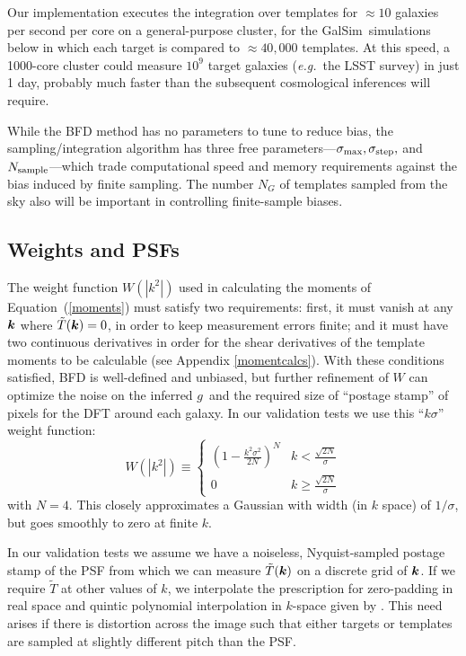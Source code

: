 \documentclass[11pt,preprint,flushrt]{aastex}
\def\eqq#1{Equation~(\ref{#1})}
\newcommand\eg{{\it e.g.\/}}
\newcommand{\vecg}{\mbox{\boldmath $g$}}
\newcommand{\veck}{\mbox{\boldmath $k$}}
\newcommand{\galsim}{{\sc GalSim}}
\begin{document}
Our implementation executes the
integration over templates for $\approx10$ galaxies per second per
core on a general-purpose cluster, for the \galsim\ simulations below
in which each target is compared to $\approx40,000$ templates.  At
this speed, a 1000-core cluster 
could measure $10^9$ target galaxies (\eg\ the LSST survey) in just 1
day, probably much faster than the subsequent cosmological inferences
will require.

While the BFD method has no parameters to tune to reduce bias, the sampling/integration
algorithm has three free parameters---$\sigma_{\rm max}, \sigma_{\rm
  step},$ and $N_{\rm sample}$---which trade computational speed
and memory requirements against the bias induced by finite sampling.
The number $N_G$ of templates sampled from the sky also will be
important in controlling finite-sample biases.
 

\subsection{Weights and PSFs}
\label{weightsec}
The weight function $W(|k^2|)$ used in calculating the moments of
\eqq{moments} must satisfy two requirements: first, it must vanish at
any $\veck$ where $\tilde T(\veck)=0$, in order to keep measurement
errors finite; and it must have two continuous derivatives in order
for the shear derivatives of the template moments to be calculable
(see Appendix \ref{momentcalcs}).
With these conditions satisfied, BFD is well-defined and unbiased,
but further refinement of $W$ can optimize the noise on the inferred
\vecg\ and the required size of ``postage stamp'' of pixels for the DFT around
each galaxy.  In our validation tests we use this
``$k\sigma$'' weight function:
\begin{equation}
\label{ksigma}
W\left(|k^2|\right)  \equiv \left\{ 
\begin{array}{cc}
\left( 1 - \frac{k^2\sigma^2}{2N}\right)^N & k <
                                             \frac{\sqrt{2N}}{\sigma} \\
0 & k \ge
                                             \frac{\sqrt{2N}}{\sigma} 
\end{array}
\right.
\end{equation}
with $N=4.$  This closely approximates a Gaussian with width (in $k$
space) of $1/\sigma$, but goes smoothly to zero at
finite $k$.

In our validation tests we assume we have a noiseless, Nyquist-sampled
postage stamp of the PSF from which we can measure $\tilde T(\veck)$
on a discrete grid of $\veck$.  If we require $\tilde T$ at other
values of \veck, we interpolate the prescription for zero-padding in
real space and quintic polynomial interpolation in $k$-space given by 
\citet{kinterp}.  This need arises if there is distortion across the
image such that either targets or templates are sampled at slightly
different pitch than the PSF.
\end{document}
